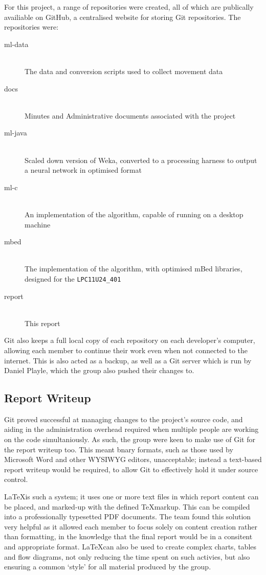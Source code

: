 For this project, a range of repositories were created, all of which are publically availiable on GitHub, a centralised website for storing Git repositories. The repositories were:

\begin{description}
    \item[ml-data] \hfill \\ The data and conversion scripts used to collect movement data
    \item[docs] \hfill \\ Minutes and Administrative documents associated with the project
    \item[ml-java] \hfill \\ Scaled down version of Weka, converted to a processing harness to output a neural network in optimised format
    \item[ml-c] \hfill \\ An implementation of the algorithm, capable of running on a desktop machine
    \item[mbed] \hfill \\ The implementation of the algorithm, with optimised mBed libraries, designed for the \verb|LPC11U24_401|
    \item[report] \hfill \\ This report
\end{description}

Git also keeps a full local copy of each repository on each developer's computer, allowing each member to continue their work even when not connected to the internet. This is also acted as a backup, as well as a Git server which is run by Daniel Playle, which the group also pushed their changes to.

\subsection{Report Writeup}
Git proved successful at managing changes to the project's source code, and aiding in the administration overhead required when multiple people are working on the code simultaniously. As such, the group were keen to make use of Git for the report writeup too. This meant bnary formats, such as those used by Microsoft Word and other WYSIWYG editors, unacceptable; instead a text-based report writeup would be required, to allow Git to effectively hold it under source control.

\LaTeX is such a system; it uses one or more text files in which report content can be placed, and marked-up with the defined \TeX markup. This can be compiled into a professionally typesetted PDF documents. The team found this solution very helpful as it allowed each member to focus solely on content creation rather than formatting, in the knowledge that the final report would be in a consitent and appropriate format. \LaTeX can also be used to create complex charts, tables and flow diagrams, not only reducing the time spent on such activies, but also ensuring a common `style' for all material produced by the group.
